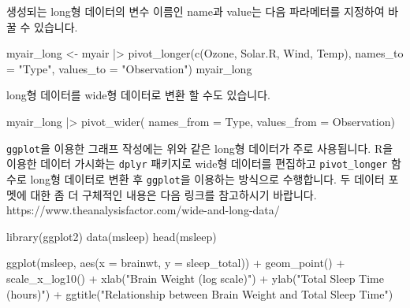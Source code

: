 \documentclass[
  a4paper,
]{book}
\newenvironment{Shaded}{\begin{snugshade}}{\end{snugshade}}
\newcommand{\AttributeTok}[1]{\textcolor[rgb]{0.40,0.45,0.13}{#1}}
\newcommand{\FunctionTok}[1]{\textcolor[rgb]{0.28,0.35,0.67}{#1}}
\newcommand{\NormalTok}[1]{\textcolor[rgb]{0.00,0.23,0.31}{#1}}
\newcommand{\OtherTok}[1]{\textcolor[rgb]{0.00,0.23,0.31}{#1}}
\newcommand{\SpecialCharTok}[1]{\textcolor[rgb]{0.37,0.37,0.37}{#1}}
\newcommand{\StringTok}[1]{\textcolor[rgb]{0.13,0.47,0.30}{#1}}
\begin{document}
생성되는 long형 데이터의 변수 이름인 name과 value는 다음 파라메터를
지정하여 바꿀 수 있습니다.

\begin{Shaded}
\begin{Highlighting}[]
\NormalTok{myair\_long }\OtherTok{\textless{}{-}}\NormalTok{ myair }\SpecialCharTok{|\textgreater{}} 
  \FunctionTok{pivot\_longer}\NormalTok{(}\FunctionTok{c}\NormalTok{(Ozone, Solar.R, Wind, Temp), }
               \AttributeTok{names\_to =} \StringTok{"Type"}\NormalTok{, }
               \AttributeTok{values\_to =} \StringTok{"Observation"}\NormalTok{)}
\NormalTok{myair\_long }
\end{Highlighting}
\end{Shaded}

long형 데이터를 wide형 데이터로 변환 할 수도 있습니다.

\begin{Shaded}
\begin{Highlighting}[]
\NormalTok{myair\_long }\SpecialCharTok{|\textgreater{}} 
  \FunctionTok{pivot\_wider}\NormalTok{(}
    \AttributeTok{names\_from =}\NormalTok{ Type, }
    \AttributeTok{values\_from =}\NormalTok{ Observation)}
\end{Highlighting}
\end{Shaded}

\texttt{ggplot}을 이용한 그래프 작성에는 위와 같은 long형 데이터가 주로
사용됩니다. R을 이용한 데이터 가시화는 \texttt{dplyr} 패키지로 wide형
데이터를 편집하고 \texttt{pivot\_longer} 함수로 long형 데이터로 변환 후
\texttt{ggplot}을 이용하는 방식으로 수행합니다. 두 데이터 포멧에 대한 좀
더 구체적인 내용은 다음 링크를 참고하시기 바랍니다.
https://www.theanalysisfactor.com/wide-and-long-data/

\begin{Shaded}
\begin{Highlighting}[]
\FunctionTok{library}\NormalTok{(ggplot2)}
\FunctionTok{data}\NormalTok{(msleep)}
\FunctionTok{head}\NormalTok{(msleep)}

\FunctionTok{ggplot}\NormalTok{(msleep, }\FunctionTok{aes}\NormalTok{(}\AttributeTok{x =}\NormalTok{ brainwt, }\AttributeTok{y =}\NormalTok{ sleep\_total)) }\SpecialCharTok{+}
  \FunctionTok{geom\_point}\NormalTok{() }\SpecialCharTok{+}
  \FunctionTok{scale\_x\_log10}\NormalTok{() }\SpecialCharTok{+}
  \FunctionTok{xlab}\NormalTok{(}\StringTok{"Brain Weight (log scale)"}\NormalTok{) }\SpecialCharTok{+}
  \FunctionTok{ylab}\NormalTok{(}\StringTok{"Total Sleep Time (hours)"}\NormalTok{) }\SpecialCharTok{+}
  \FunctionTok{ggtitle}\NormalTok{(}\StringTok{"Relationship between Brain Weight and Total Sleep Time"}\NormalTok{)}
\end{Highlighting}
\end{Shaded}
\end{document}
